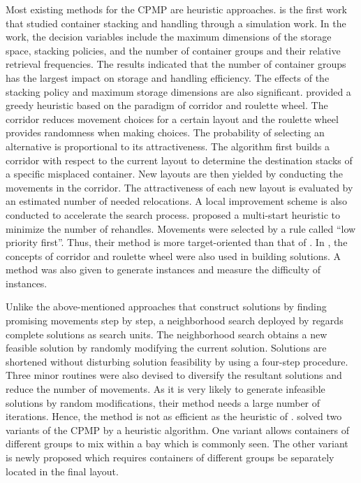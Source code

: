 \documentclass[review,3p,times,authoryear,12pt]{elsarticle}
\begin{document}
Most existing methods for the CPMP are heuristic approaches.
\cite{Sculli1988} is the first work that studied container stacking and handling through a simulation work.
In the work, the decision variables include the maximum dimensions of the storage space, stacking policies, and the number of container groups and their relative retrieval frequencies. The results indicated that the number of container groups has the largest impact on storage and handling efficiency. The effects of the stacking policy and maximum storage dimensions are also significant.
\cite{Caserta2009} provided a greedy heuristic based on the paradigm of corridor and roulette wheel.
The corridor reduces movement choices for a certain layout and the roulette wheel provides randomness when making choices.
The probability of selecting an alternative is proportional to its attractiveness.
The algorithm first builds a corridor with respect to the current layout to determine the destination stacks of a specific misplaced container.
New layouts are then yielded by conducting the movements in the corridor.
The attractiveness of each new layout is evaluated by an estimated number of needed relocations.
A local improvement scheme is also conducted to accelerate the search process.
\cite{Exposito2012} proposed a multi-start heuristic to minimize the number of rehandles.
Movements were selected by a rule called ``low priority first''.
Thus, their method is more target-oriented than that of \cite{Caserta2009}.
In \cite{Exposito2012}, the concepts of corridor and roulette wheel were also used in building solutions.
A method was also given to generate instances and measure the difficulty of instances.

Unlike the above-mentioned approaches that construct solutions by finding promising movements step by step, a neighborhood search deployed by \cite{Lee2009} regards complete solutions as search units.
The neighborhood search obtains a new feasible solution by randomly modifying the current solution.
Solutions are shortened without disturbing solution feasibility by using a four-step procedure.
Three minor routines were also devised to diversify the resultant solutions and reduce the number of movements.
As it is very likely to generate infeasible solutions by random modifications, their method needs a large number of iterations.
Hence, the method is not as efficient as the heuristic of \cite{Exposito2012}.
\cite{Huang2012heu} solved two variants of the CPMP by a heuristic algorithm.
One variant allows containers of different groups to mix within a bay which is commonly seen.
The other variant is newly proposed which requires containers of different groups be separately located in the final layout.
\end{document}
